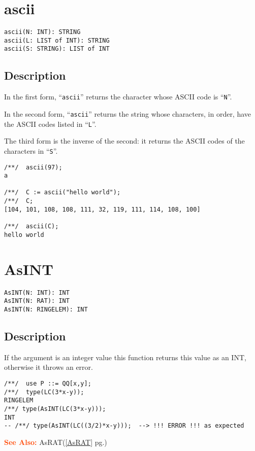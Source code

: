 \documentclass[a4paper]{mybook}
\newenvironment{command}{}{} %
\newcommand\SeeAlso{\par\textcolor{OrangeRed}{\textbf{\large See Also: }}}
\begin{document}
\section{ascii}
\label{ascii}
\begin{command} %


\begin{Verbatim}[label=syntax, rulecolor=\color{MidnightBlue},
frame=single]
ascii(N: INT): STRING
ascii(L: LIST of INT): STRING
ascii(S: STRING): LIST of INT
\end{Verbatim}


\subsection*{Description}

In the first form, ``\verb&ascii&'' returns the character whose ASCII code is ``\verb&N&''.
\par 
In the second form, ``\verb&ascii&'' returns the string whose characters, in
order, have the ASCII codes listed in ``\verb&L&''.
\par 
The third form is the inverse of the second: it returns the ASCII codes
of the characters in ``\verb&S&''.
\begin{Verbatim}[label=example, rulecolor=\color{PineGreen}, frame=single]
/**/  ascii(97);
a

/**/  C := ascii("hello world");
/**/  C;
[104, 101, 108, 108, 111, 32, 119, 111, 114, 108, 100]

/**/  ascii(C);
hello world
\end{Verbatim}


\end{command} %

\section{AsINT}
\label{AsINT}
\begin{command} %


\begin{Verbatim}[label=syntax, rulecolor=\color{MidnightBlue},
frame=single]
AsINT(N: INT): INT
AsINT(N: RAT): INT
AsINT(N: RINGELEM): INT
\end{Verbatim}


\subsection*{Description}

If the argument is an integer value this function returns this value as
an INT, otherwise it throws an error.
\begin{Verbatim}[label=example, rulecolor=\color{PineGreen}, frame=single]
/**/  use P ::= QQ[x,y];
/**/  type(LC(3*x-y));
RINGELEM
/**/ type(AsINT(LC(3*x-y)));
INT
-- /**/ type(AsINT(LC((3/2)*x-y)));  --> !!! ERROR !!! as expected
\end{Verbatim}


\SeeAlso %
  AsRAT(\ref{AsRAT} pg.\pageref{AsRAT})
\end{command} %
\end{document}

